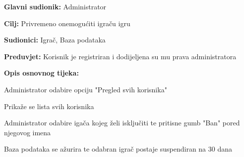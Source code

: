 \noindent {}
\begin{packed_item}
	
	\item \textbf{Glavni sudionik: }Administrator
	\item  \textbf{Cilj:} Privremeno onemogućiti igraču igru
	\item  \textbf{Sudionici:} Igrač, Baza podataka
	\item  \textbf{Preduvjet:} Korisnik je registriran i dodijeljena su mu prava administratora
	\item  \textbf{Opis osnovnog tijeka:}
	
	\item[] \begin{packed_enum}
		
		\item Administrator odabire opciju "Pregled svih korisnika"
		\item Prikaže se lista svih korisnika
		\item Administrator odabire igača kojeg želi isključiti te pritisne gumb "Ban" pored njegovog imena
		\item Baza podataka se ažurira te odabran igrač postaje suspendiran na 30 dana
		
	\end{packed_enum}
\end{packed_item}


